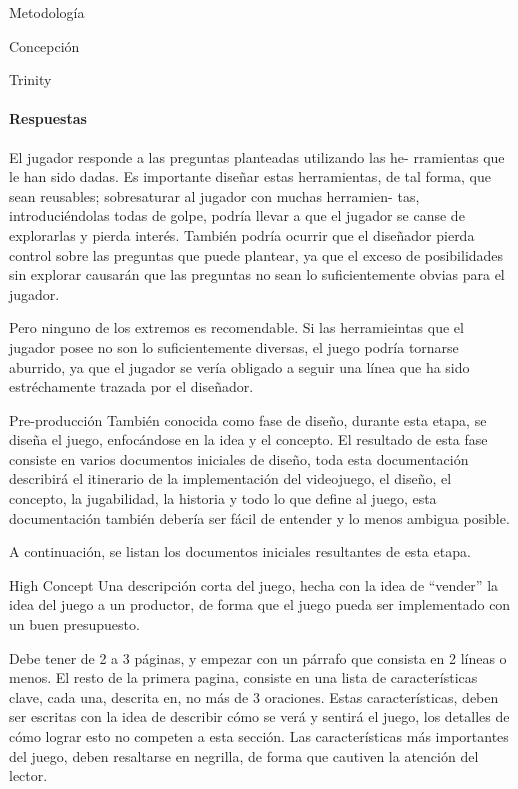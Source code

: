 \begin{section}{Metodología}
\begin{subsection}{Concepción}
\begin{subsubsection}{Trinity}
      \paragraph{Respuestas}

      El jugador responde a las preguntas planteadas utilizando las he- rramientas que le han sido dadas. Es importante diseñar estas herramientas, de tal forma, que sean reusables; sobresaturar al jugador con muchas herramien- tas, introduciéndolas todas de golpe, podría llevar a que el jugador se canse de explorarlas y pierda interés. También podría ocurrir que el diseñador pierda control sobre las preguntas que puede plantear, ya que el exceso de posibilidades sin explorar causarán que las preguntas no sean lo suficientemente obvias para el jugador.

      Pero ninguno de los extremos es recomendable. Si las herramieintas que el jugador posee no son lo suficientemente diversas, el juego podría tornarse aburrido, ya que el jugador se vería obligado a seguir una línea que ha sido estréchamente trazada por el diseñador.
    \end{subsubsection}
  \end{subsection}

  \begin{subsection}{Pre-producción}
    También conocida como fase de diseño, durante esta etapa, se diseña el juego, enfocándose en la idea y el concepto. El resultado de esta fase consiste en varios documentos iniciales de diseño, toda esta documentación describirá el itinerario de la implementación del videojuego, el diseño, el concepto, la jugabilidad, la historia y todo lo que define al juego, esta documentación también debería ser fácil de entender y lo menos ambigua posible.

    A continuación, se listan los documentos iniciales resultantes de esta etapa.

    \begin{subsubsection}{High Concept}
      Una descripción corta del juego, hecha con la idea de ``vender'' la idea del juego a un productor, de forma que el juego pueda ser implementado con un buen presupuesto.

      Debe tener de 2 a 3 páginas, y empezar con un párrafo que consista en 2 líneas o menos. El resto de la primera pagina, consiste en una lista de características clave, cada una, descrita en, no más de 3 oraciones. Estas características, deben ser escritas con la idea de describir cómo se verá y sentirá el juego, los detalles de cómo lograr esto no competen a esta sección. Las características más importantes del juego, deben resaltarse en negrilla, de forma que cautiven la atención del lector.


\end{subsubsection}
\end{subsection}
\end{section}
